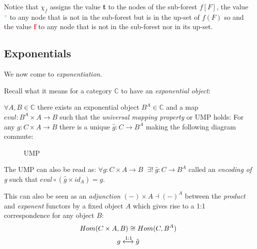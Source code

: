 Notice that $\chi_f$ assigns the value \textcolor{OliveGreen}{\textbf{t}} to the nodes of the sub-forest $f[F]$,  the value \textcolor{SkyBlue}{\textbf{$*$}} to any node that is not in the sub-forest but is in the up-set of $f(F)$ so  and the value \textcolor{red}{\textbf{f}} to any node that is not in the sub-forest nor in its up-set. 

\newpage
\subsection{Exponentials}

We now come to \emph{exponentiation}.

Recall what it means for a category $\mathbb{C}$ to have an \emph{exponential object}:
\begin{definition}
	$\forall A, B \in \mathbb{C}$ there exists an exponential object $B^A \in \mathbb{C}$ and a map $eval : B^A \times A \rightarrow B$ such that the  \emph{universal mapping property} or UMP holds: For any $g :C \times A \rightarrow B$ there is a unique $\hat{g} :C \rightarrow B^A$ making the following diagram commute:
	
	\begin{figure}[h]
		\centering
		\caption{UMP}
	\end{figure}
	
\end{definition}

 \begin{remark}
 	The UMP can also be read as: $\forall g :C \times A \rightarrow B\;$ $\exists! \;\hat{g} :C \rightarrow B^A$ called an \emph{encoding of g} such that $eval \circ (\hat{g}\times id_A) = g$.
 \end{remark}


\begin{remark}
	This can also be seen as an \emph{adjunction} $ (-) \times A \dashv (-)^{A} $ between the \emph{product} and \emph{exponent} functors by a fixed object $A$ which gives rise to a 1:1 correspondence for any object $B$:
	\begin{gather*}
		Hom(C \times A, B) \cong Hom(C,B^A) \\
		g \xleftrightarrow{1:1} \hat{g}
	\end{gather*} 
\end{remark}
 
